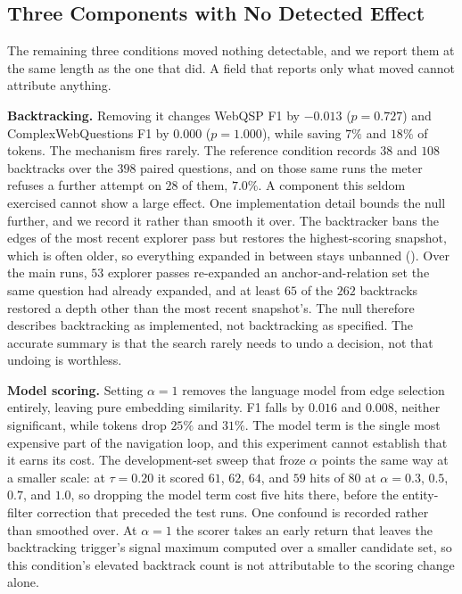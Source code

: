 \subsection{Three Components with No Detected Effect}\label{sec:nulls}

The remaining three conditions moved nothing detectable, and we report
them at the same length as the one that did. A field that reports only
what moved cannot attribute anything.

\textbf{Backtracking.} Removing it changes WebQSP F1 by $-0.013$ ($p =
0.727$) and ComplexWebQuestions F1 by $0.000$ ($p = 1.000$), while
saving $7\%$ and $18\%$ of tokens. The mechanism fires rarely. The
reference condition records $38$ and $108$ backtracks over the $398$
paired questions, and on those same runs the meter refuses a further
attempt on $28$ of them, $7.0\%$. A component this seldom exercised
cannot show a large effect. One implementation detail bounds the null
further, and we record it rather than smooth it over. The backtracker
bans the edges of the most recent explorer pass but restores the
highest-scoring snapshot, which is often older, so everything expanded
in between stays unbanned (). Over the main runs,
$53$ explorer passes re-expanded an anchor-and-relation set the same
question had already expanded, and at least $65$ of the $262$ backtracks
restored a depth other than the most recent snapshot's. The null
therefore describes backtracking as implemented, not backtracking as
specified. The accurate summary is that the search rarely needs to undo
a decision, not that undoing is worthless.

\textbf{Model scoring.} Setting $\alpha = 1$ removes the language model
from edge selection entirely, leaving pure embedding similarity. F1
falls by $0.016$ and $0.008$, neither significant, while tokens drop
$25\%$ and $31\%$. The model term is the single most expensive part of
the navigation loop, and this experiment cannot establish that it earns
its cost. The development-set sweep that froze $\alpha$ points the same
way at a smaller scale: at $\tau = 0.20$ it scored $61$, $62$, $64$, and
$59$ hits of $80$ at $\alpha = 0.3$, $0.5$, $0.7$, and $1.0$, so
dropping the model term cost five hits there, before the entity-filter
correction that preceded the test runs. One confound is recorded rather
than smoothed over. At $\alpha = 1$ the scorer takes an early return
that leaves the backtracking trigger's signal maximum computed over a
smaller candidate set, so this condition's elevated backtrack count is
not attributable to the scoring change alone.


